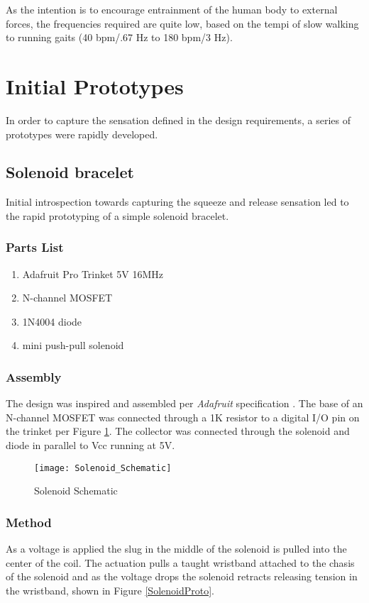 As the intention is to encourage entrainment of the human body to external forces, the frequencies
required are quite low, based on the tempi of slow walking to running gaits
(40 bpm/.67 Hz to 180 bpm/3 Hz).

\section{Initial Prototypes} \label{initProto}
In order to capture the sensation defined in the design requirements, a series of prototypes were rapidly developed.

\subsection{Solenoid bracelet}
Initial introspection towards capturing the squeeze and release sensation led to the rapid prototyping of a simple solenoid bracelet. 
\subsubsection{Parts List}
\begin{enumerate}
    \item Adafruit Pro Trinket 5V 16MHz
    \item N-channel MOSFET
    \item 1N4004 diode
    \item mini push-pull solenoid
\end{enumerate}
\subsubsection{Assembly}
The design was inspired and assembled per \textit{Adafruit} specification \cite{Solenoid}. 
The base of an N-channel MOSFET was connected through a 1K resistor to a digital I/O pin on the trinket per Figure \ref{SolenoidSchematic}. The collector was connected through the solenoid and diode in parallel to Vcc running at 5V.
\begin{figure}[H]
    \texttt{[image: Solenoid\_Schematic]}
    \caption{Solenoid Schematic}
    \label{SolenoidSchematic}
\end{figure}
\subsubsection{Method}
    As a voltage is applied the slug in the middle of the solenoid is pulled into the center of the coil. The actuation pulls a taught wristband attached to the chasis of the solenoid and as the voltage drops the solenoid retracts releasing tension in the wristband, shown in Figure \ref{SolenoidProto}.
    
